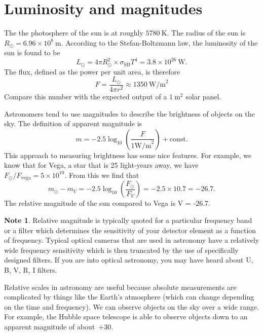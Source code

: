 \documentclass[a4paper,12pt]{article}
\theoremstyle{remark}
\newcommand{\mrm}[1]{\mathrm{#1}}
\renewcommand{\=}[1]{\stackrel{#1}{=}} %
\theoremstyle{plain}
\theoremstyle{definition}
\newtheorem*{definitionT}{Note}%
\newenvironment{note}{
\begin{dBox}
\begin{definitionT}}
{\end{definitionT}
\end{dBox}}
\begin{document}
\section{Luminosity and magnitudes}
The the photosphere of the sun is at roughly $5780 \:\mrm{K}$. The radius of the sun is $R_\odot = 6.96 \times 10^{8} \:\mrm{m}$. According to the Stefan-Boltzmann law, the luminosity of the sun is found to be
\begin{equation}
L _\odot = 4\pi R_\odot ^{2} \times \sigma _\mrm{SB} T^{4} = 3.8 \times 10^{26} \:\mrm{W}.
\end{equation}
The flux, defined as the power per unit area, is therefore
\begin{equation}
F = \frac{L_\odot}{4\pi r^{2}} \approx 1350 \:\mrm{W/m}^{2}
\end{equation}
Compare this number with the expected output of a $1 \:\mrm{m}^{2}$ solar panel.

Astronomers tend to use magnitudes to describe the brightness of objects on the sky. The definition of apparent magnitude is 
\begin{equation}
m = -2.5 \log _{10} \left( \frac{F}{1 \mrm{W/m}^{2}} \right) + \mrm{const}.
\end{equation}
This approach to measuring brightness has some nice features. For example, we know that for Vega, a star that is 25 light-years away, we have $F_\odot / F_\mrm{vega} = 5\times 10^{10}$. From this we find that
\begin{equation}
m_\odot - m_V = -2.5 \log _{10} \left( \frac{F_\odot}{F_V} \right) = -2.5 \times 10.7 = -26.7.
\end{equation}
The relative magnitude of the sun compared to Vega is V = -26.7. 

\begin{note}
Relative magnitude is typically quoted for a particular frequency band or a filter which determines the sensitivity of your detector element as a function of frequency. Typical optical cameras that are used in astronomy have a relatively wide frequency sensitivity which is then truncated by the use of specifically designed filters. If you are into optical astronomy, you may have heard about U, B, V, R, I filters.
\end{note}

Relative scales in astronomy are useful because absolute measurements are complicated by things like the Earth's atmosphere (which can change depending on the time and frequency). We can observe objects on the sky over a wide range. For example, the Hubble space telescope is able to observe objects down to an apparent magnitude of about~$+30$.
\end{document}
